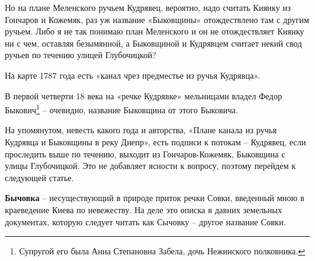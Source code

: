 Но на плане Меленского ручьем Кудрявец, вероятно, надо считать Киянку из Гончаров и Кожемяк, раз уж название «Быковщины» отождествлено там с другим ручьем. Либо я не так понимаю план Меленского и он не отождествляет Киянку ни с чем, оставляя безымянной, а Быковщиной и Кудрявцем считает некий свод ручьев по течению улицей Глубочицкой?

На карте 1787 года есть «канал чрез предместье из ручья Кудрявца».

В первой четверти 18 века на «речке Кудрявке» мельницами владел Федор Быкович\footnote{Супругой его была Анна Степановна Забела, дочь Нежинского полковника.} – очевидно, название Быковщина от этого Быковича.

На упомянутом, невесть какого года и авторства, «Плане канала из ручья Кудрявца и Быковщины в реку Днепр», есть подписи к потокам – Кудрявец, если проследить выше по течению, выходит из Гончаров-Кожемяк, Быковщина с улицы Глубочицкой. Это не добавляет ясности к вопросу, поэтому перейдем к следующей статье.\\

\medskip

\textbf{Бычовка} – несуществующий в природе приток речки Совки, введенный мною в краеведение Киева по невежеству. На деле это описка в давних земельных документах, которую следует читать как Сычовку – другое название Совки.
